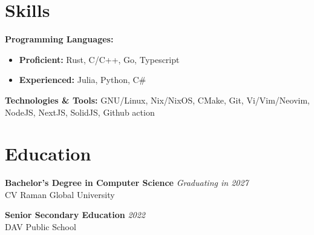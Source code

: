 \section*{Skills}
\textbf{Programming Languages:}
\begin{itemize}[noitemsep, topsep=0pt]
    \item \textbf{Proficient:} Rust, C/C++, Go, Typescript
    \item \textbf{Experienced:} Julia, Python, C\#
\end{itemize}

\noindent\textbf{Technologies \& Tools:} GNU/Linux, Nix/NixOS, CMake, Git, Vi/Vim/Neovim, NodeJS, NextJS, SolidJS, Github action \\

\section*{Education}
\noindent\textbf{Bachelor's Degree in Computer Science} \hfill \textit{Graduating in 2027}\\
\noindent CV Raman Global University

\noindent\textbf{Senior Secondary Education} \hfill \textit{2022}\\
\noindent DAV Public School



